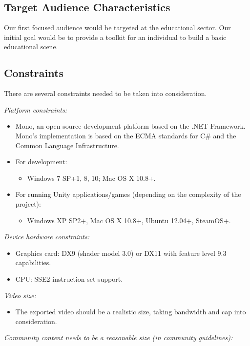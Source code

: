 \begin{flushleft}
\subsection{Target Audience Characteristics}

	Our first focused audience would be targeted at the educational sector. Our initial goal would be to provide a toolkit for an individual to build a basic educational scene.

\subsection{Constraints}
There are several constraints needed to be taken into consideration.
\bigskip
\begin{flushleft}
\textsl{Platform constraints:}
\end{flushleft}
	\begin{itemize}
		\item Mono, an open source development platform based on the .NET Framework. Mono’s implementation is based on the ECMA standards for C\# and the Common Language Infrastructure.
		\item For development:
			\begin{itemize}
				\item Windows 7 SP+1, 8, 10; Mac OS X 10.8+.
			\end{itemize}
		\item For running Unity applications/games (depending on the complexity of the project):
			\begin{itemize}
				\item Windows XP SP2+, Mac OS X 10.8+, Ubuntu 12.04+, SteamOS+.
			\end{itemize}
	\end{itemize}
\medskip
\textsl{Device hardware constraints:}
	\begin{itemize}
		\item Graphics card: DX9 (shader model 3.0) or DX11 with feature level 9.3 capabilities.
		\item CPU: SSE2 instruction set support.
	\end{itemize}
\medskip
\textsl{Video size:}
	\begin{itemize}
		\item The exported video should be a realistic size, taking bandwidth and cap into consideration.
	\end{itemize}
\medskip
\textsl{Community content needs to be a reasonable size (in community guidelines):}
	\begin{itemize}

\end{itemize}
\end{flushleft}
